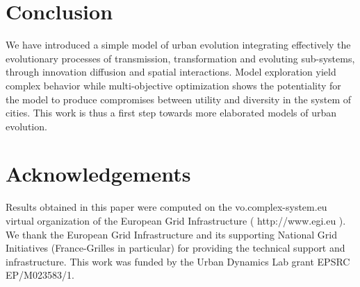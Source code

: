 \documentclass[letterpaper]{article}
\begin{document}
\section{Conclusion}

We have introduced a simple model of urban evolution integrating effectively the evolutionary processes of transmission, transformation and evoluting sub-systems, through innovation diffusion and spatial interactions. Model exploration yield complex behavior while multi-objective optimization shows the potentiality for the model to produce compromises between utility and diversity in the system of cities. This work is thus a first step towards more elaborated models of urban evolution.


\bigskip

\section{Acknowledgements}

Results obtained in this paper were computed on the vo.complex-system.eu virtual organization of the European Grid Infrastructure ( http://www.egi.eu ). We thank the European Grid Infrastructure and its supporting National Grid Initiatives (France-Grilles in particular) for providing the technical support and infrastructure. This work was funded by the Urban Dynamics Lab grant EPSRC EP/M023583/1.

\bigskip

\footnotesize
%
\end{document}
